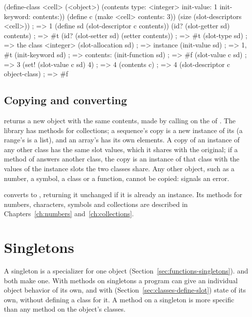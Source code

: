 \begin{dylan}
(define-class <cell> (<object>)
  (contents type: <integer> init-value: 1 init-keyword: contents:))
(define c (make <cell> contents: 3))
(size (slot-descriptors <cell>))       ; => 1
(define sd (slot-descriptor c contents))
(id? (slot-getter sd) contents)        ; => #t
(id? (slot-setter sd) (setter contents)) ; => #t
(slot-type sd)                         ; => {the class <integer>}
(slot-allocation sd)                   ; => instance
(init-value sd)                        ; => 1, #t
(init-keyword sd)                      ; => contents:
(init-function sd)                     ; => #f
(slot-value c sd)                      ; => 3
(set! (slot-value c sd) 4)             ; => 4
(contents c)                           ; => 4
(slot-descriptor c object-class)       ; => #f
\end{dylan}

\subsection{Copying and converting}

 returns a new object with the same
contents, made by calling  on the  of
. The library has methods for collections; a sequence's copy
is a new instance of its  (a range's is a list), and
an array's has its own elements. A copy of an instance of any other class
has the same slot values, which it shares with the original; if a method
of  answers another class, the copy is an instance of
that class with the values of the instance slots the two classes share.
Any other object, such as a
number, a symbol, a class or a function, cannot be copied:
 signals an error.

 converts  to
, returning it unchanged if it is already an instance. Its
methods for numbers, characters, symbols and collections are described in
Chapters~\ref{ch:numbers} and~\ref{ch:collections}.

\section{Singletons}\label{sec:classes-singletons}

A singleton is a specializer for one object (Section~\ref{sec:functions-singletons}).
 and  both make one. With methods on singletons a program can give
an individual object behavior of its own, and with 
(Section~\ref{sec:classes-define-slot}) state of its own, without defining a
class for it. A method on a singleton is more specific than any method on
the object's classes.

